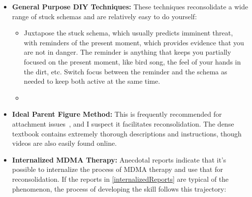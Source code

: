 \documentclass[11pt,oneside]{book}
\let\cite\parencite
\newcommand{\prosecite}[1]{\citetitle{#1} by \citefullauthor{#1}~\cite{#1}}
\begin{document}
\begin{itemize}
    Avoidance of distressing but contradictory information is one of the primary mechanisms that maintain stuck schemas over time~\cite{berghBSTS}. I suspect that daily practices of deliberate non-avoidance, like some types of meditation, can facilitate reconsolidation. I suggest \prosecite{rain}. It is precisely the kind of meditation that I expect would do this.
 	 	
    Increasing attention and non-avoidance in the days to weeks following an MDMA therapy session may be especially productive for two reasons. First, some people report a 1--2\,week afterglow period (see \cref{afterglow}) where reconsolidation exercises feel easier. Second, MDMA-facilitated reconsolidation reduces the strength of the elements reinforcing stuck states of mental illness (see \cref{sec:complex}). The brain's natural updating process might now have the capacity to make further shifts as long as attention is devoted to your stuck schemas. I think this may be why MDMA therapy practitioners commonly recommend clients take time after a session for \textit{integration} activities. These include meditation, yoga, journaling, making art about feelings, walking in nature to spend time with yourself, massage, listening to a recording of your session, singing, dancing, and breathing exercises~\cite{mithoeferManual}.
    \item \textbf{General Purpose DIY Techniques:} These techniques reconsolidate a wide range of stuck schemas and are relatively easy to do yourself:
    \begin{itemize}
        \item Juxtapose the stuck schema, which usually predicts imminent threat, with reminders of the present moment, which provides evidence that you are not in danger. The reminder is anything that keeps you partially focused on the present moment, like bird song, the feel of your hands in the dirt, etc. Switch focus between the reminder and the schema as needed to keep both active at the same time.
        \item 
    \end{itemize}
    \item \textbf{Ideal Parent Figure Method:} \label{def:ipf} This is frequently recommended for attachment issues~\cite{brownAttachmentDisturbances}, and I suspect it facilitates reconsolidation. The dense textbook \textcite{brownAttachmentDisturbances} contains extremely thorough descriptions and instructions, though videos are also easily found online.
	\item \textbf{Internalized MDMA Therapy:} Anecdotal reports indicate that it's possible to internalize the process of MDMA therapy and use that for reconsolidation. If the reports in \cref{internalizedReports} are typical of the phenomenon, the process of developing the skill follows this trajectory:

\end{itemize}
\end{document}
